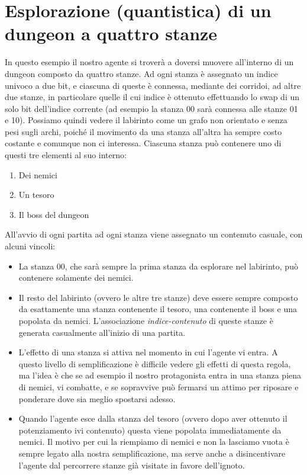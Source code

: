 \documentclass{book}
\theoremstyle{definition}
\theoremstyle{definition}
\theoremstyle{definition}
\theoremstyle{plain}
\theoremstyle{plain}
\theoremstyle{plain}
\theoremstyle{plain}
\begin{document}
\section{Esplorazione (quantistica) di un dungeon a quattro stanze}
In questo esempio il nostro agente si troverà a doversi muovere all'interno di un dungeon composto da quattro stanze. Ad ogni stanza è assegnato un indice univoco a due bit, e ciascuna di queste è connessa, mediante dei corridoi, ad altre due stanze, in particolare quelle il cui indice è ottenuto effettuando lo swap di un solo bit dell'indice corrente (ad esempio la stanza 00 sarà connessa alle stanze 01 e 10). Possiamo quindi vedere il labirinto come un grafo non orientato e senza pesi sugli archi, poiché il movimento da una stanza all'altra ha sempre costo costante e comunque non ci interessa. Ciascuna stanza può contenere uno di questi tre elementi al suo interno:
\begin{enumerate}
    \item Dei nemici
    \item Un tesoro
    \item Il boss del dungeon
\end{enumerate}
All'avvio di ogni partita ad ogni stanza viene assegnato un contenuto casuale, con alcuni vincoli:
\begin{itemize}
    \item La stanza 00, che sarà sempre la prima stanza da esplorare nel labirinto, può contenere solamente dei nemici.
    \item Il resto del labirinto (ovvero le altre tre stanze) deve essere sempre composto da esattamente una stanza contenente il tesoro, una contenente il boss e una popolata da nemici. L'associazione \textit{indice-contenuto} di queste stanze è generata casualmente all'inizio di una partita.
    \item L'effetto di una stanza si attiva nel momento in cui l'agente vi entra. A questo livello di semplificazione è difficile vedere gli effetti di questa regola, ma l'idea è che se ad esempio il nostro protagonista entra in una stanza piena di nemici, vi combatte, e se sopravvive può fermarsi un attimo per riposare e ponderare dove sia meglio spostarsi adesso.
    \item Quando l'agente esce dalla stanza del tesoro (ovvero dopo aver ottenuto il potenziamento ivi contenuto) questa viene popolata immediatamente da nemici. %
    Il motivo per cui la riempiamo di nemici e non la lasciamo vuota è sempre legato alla nostra semplificazione, ma serve anche a disincentivare l'agente dal percorrere stanze già visitate in favore dell'ignoto.
\end{itemize}
\end{document}
